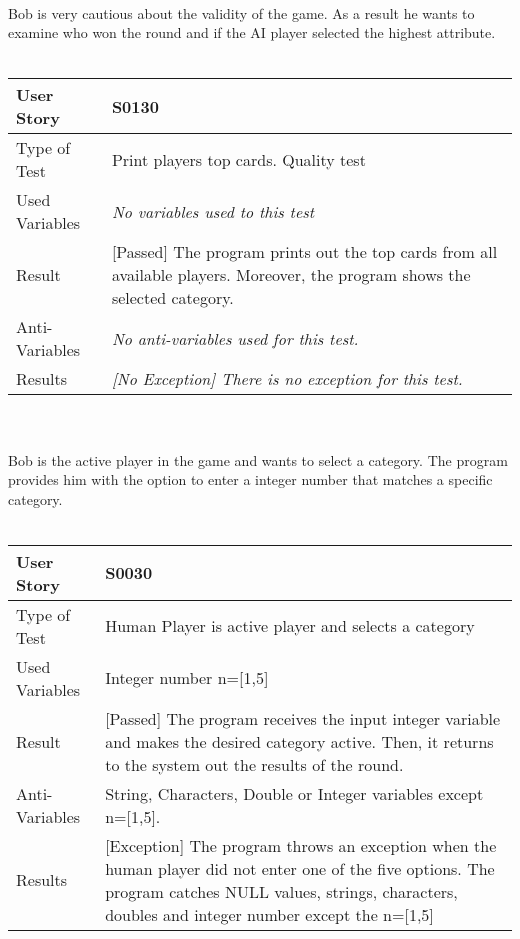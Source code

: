 \vspace{0.8cm}\\
Bob is very cautious about the validity of the game. As a result he wants to examine who won the round and if the AI player selected the highest attribute.\\
\vspace{0.2cm}\\
\begin{tabular}{l | p{10cm}}
User Story & \textbf{S0130} \\ \hline
Type of Test & Print players top cards. Quality test \\ \hline
Used Variables & \textit{No variables used to this test}\\ \hline
Result & [Passed] The program prints out the top cards from all available players. Moreover, the program shows the selected category.\\ \hline
Anti-Variables & \textit{No anti-variables used for this test.}\\ \hline
Results & \textit{[No Exception] There is no exception for this test.}\\ \hline
\end{tabular}\\
\vspace{0.8cm}\\
Bob is the active player in the game and wants to select a category. The program provides him with the option to enter a integer number that matches a specific category.\\
\vspace{0.2cm}\\
\begin{tabular}{l | p{10cm}}
User Story & \textbf{S0030}\\ \hline
Type of Test & Human Player is active player and selects a category\\ \hline
Used Variables & Integer number n=[1,5]\\ \hline
Result & [Passed] The program receives the input integer variable and makes the desired category active. Then, it returns to the system out the results of the round.\\ \hline
Anti-Variables & String, Characters, Double or Integer variables except n=[1,5].\\ \hline
Results & [Exception] The program throws an exception when the human player did not enter one of the five options. The program catches NULL values, strings, characters, doubles and integer number except the n=[1,5]\\ \hline
\end{tabular}\\
